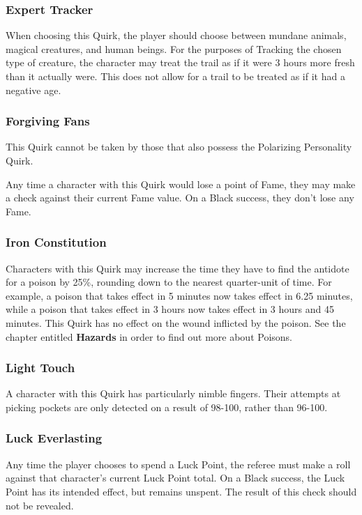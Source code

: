 \documentclass[oneside]{book}
\begin{document}
\begin{multicols}{2}
\subsubsection{Expert Tracker}
When choosing this Quirk, the player should choose between mundane animals, magical creatures, and human beings. For the purposes of Tracking the chosen type of creature, the character may treat the trail as if it were 3 hours more fresh than it actually were. This does not allow for a trail to be treated as if it had a negative age.

\subsubsection{Forgiving Fans}
This Quirk cannot be taken by those that also possess the Polarizing Personality Quirk.

Any time a character with this Quirk would lose a point of Fame, they may make a check against their current Fame value. On a Black success, they don't lose any Fame. 

\subsubsection{Iron Constitution}
Characters with this Quirk may increase the time they have to find the antidote for a poison by 25\%, rounding down to the nearest quarter-unit of time. For example, a poison that takes effect in 5 minutes now takes effect in 6.25 minutes, while a poison that takes effect in 3 hours now takes effect in 3 hours and 45 minutes. This Quirk has no effect on the wound inflicted by the poison. See the chapter entitled \textbf{Hazards} in order to find out more about Poisons. 

\subsubsection{Light Touch}
A character with this Quirk has particularly nimble fingers. Their attempts at picking pockets are only detected on a result of 98-100, rather than 96-100.     

\subsubsection{Luck Everlasting}
Any time the player chooses to spend a Luck Point, the referee must make a roll against that character's current Luck Point total. On a Black success, the Luck Point has its intended effect, but remains unspent. The result of this check should not be revealed. 


\end{multicols}
\end{document}
